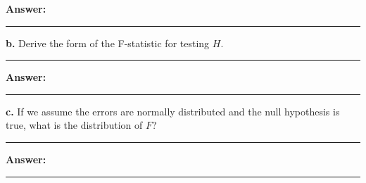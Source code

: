 \documentclass[
]{article}
\begin{document}
\textbf{Answer:}

\begin{center}\rule{0.5\linewidth}{0.5pt}\end{center}

\textbf{b.} Derive the form of the F-statistic for testing \(H\).

\begin{center}\rule{0.5\linewidth}{0.5pt}\end{center}

\textbf{Answer:}

\begin{center}\rule{0.5\linewidth}{0.5pt}\end{center}

\textbf{c.} If we assume the errors are normally distributed and the
null hypothesis is true, what is the distribution of \(F\)?

\begin{center}\rule{0.5\linewidth}{0.5pt}\end{center}

\textbf{Answer:}

\begin{center}\rule{0.5\linewidth}{0.5pt}\end{center}
\end{document}
